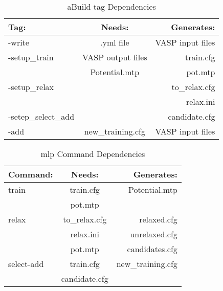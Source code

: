 \documentclass{article}
\begin{document}
\begin{table}
        \begin{center}
                \caption{aBuild tag Dependencies}
                \label{aBuilddepend}
                \begin{tabular}{l|c|r}
                  \textbf{Tag:} & \textbf{Needs:} & \textbf{Generates:}\\
                  \hline
                  -write & .yml file & VASP input files \\
                  -setup_train & VASP output files & train.cfg \\
                   & Potential.mtp & pot.mtp \\
                  -setup_relax & %
                                                  & to_relax.cfg \\
                                & & relax.ini \\
                  -setep_select_add & %
                                                  & candidate.cfg \\
                  -add & new_training.cfg & VASP input files \\
                \end{tabular}
        \end{center}
\end{table}

\begin{table}
        \begin{center}
                \caption{mlp Command Dependencies}
                \label{mlpdepend}
                \begin{tabular}{l|c|r}
                  \textbf{Command:} & \textbf{Needs:} & \textbf{Generates:}\\
                  \hline
                  train & train.cfg & Potential.mtp \\
                                    & pot.mtp & \\
                  relax & to_relax.cfg & relaxed.cfg \\
                                    & relax.ini & unrelaxed.cfg \\
                                    & pot.mtp & candidates.cfg \\
                  select-add & train.cfg & new_training.cfg \\
                   & candidate.cfg & \\
                \end{tabular}
        \end{center}
\end{table}
\end{document}
